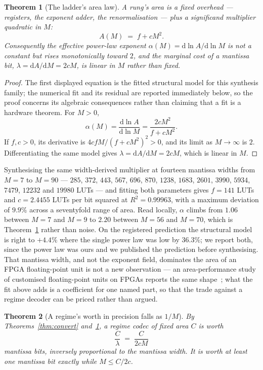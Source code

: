 \documentclass[11pt]{article}
\newtheorem{theorem}{Theorem}
\theoremstyle{definition}
\begin{document}
\begin{theorem}[The ladder's area law]
\label{thm:alpha}
A rung's area is a fixed overhead --- registers, the exponent adder, the
renormalisation --- plus a significand multiplier quadratic in $M$:
\[
A(M) \;=\; f + cM^{2}.
\]
Consequently the effective power-law exponent
$\alpha(M) = \mathrm{d}\ln A/\mathrm{d}\ln M$ is not a constant but rises
monotonically toward $2$, and the marginal cost of a mantissa bit,
$\lambda = \mathrm{d}A/\mathrm{d}M = 2cM$, is \emph{linear} in $M$ rather than
fixed.
\end{theorem}
\begin{proof}
The first displayed equation is the fitted structural model for this synthesis
family; the numerical fit and its residual are reported immediately below, so
the proof concerns its algebraic consequences rather than claiming that a fit is
a hardware theorem. For $M>0$,
\[
\alpha(M)=\frac{\mathrm d\ln A}{\mathrm d\ln M}
          =\frac{2cM^{2}}{f+cM^{2}}.
\]
If $f,c>0$, its derivative is
$4cfM/(f+cM^{2})^{2}>0$, and its limit as $M\to\infty$ is $2$.
Differentiating the same model gives
$\lambda=\mathrm dA/\mathrm dM=2cM$, which is linear in $M$.
\end{proof}

Synthesising the same width-derived multiplier at fourteen mantissa widths from
$M{=}7$ to $M{=}90$ --- $285$, $372$, $443$, $567$, $696$, $870$, $1238$, $1683$,
$2601$, $3990$, $5934$, $7479$, $12232$ and $19980$ LUTs --- and fitting both
parameters gives $f = 141$ LUTs and $c = 2.4455$ LUTs per bit squared at
$R^2 = 0.99963$, with a maximum deviation of $9.9\%$ across a seventyfold range of
area. Read locally, $\alpha$ climbs from $1.06$ between $M{=}7$ and $M{=}9$ to
$2.20$ between $M{=}56$ and $M{=}70$, which is Theorem~\ref{thm:alpha} rather than
noise. On the registered prediction the structural model is right to $+4.4\%$
where the single power law was low by $36.3\%$; we report both, since the power
law was ours and we published the prediction before synthesising. That mantissa
width, and not the exponent field, dominates the area of an FPGA floating-point
unit is not a new observation --- an area-performance study of customised
floating-point units on FPGAs reports the same shape~\cite{echeverria2011customizing};
what the fit above adds is a coefficient for one named part, so that the trade
against a regime decoder can be priced rather than argued.

\begin{theorem}[A regime's worth in precision falls as $1/M$]
\label{thm:oneoverm}
By Theorems~\ref{thm:convert} and~\ref{thm:alpha}, a regime codec of fixed area
$C$ is worth
\[
\frac{C}{\lambda} \;=\; \frac{C}{2cM}
\]
mantissa bits, inversely proportional to the mantissa width. It is worth at least
one mantissa bit exactly while $M \leq C/2c$.
\end{theorem}
\end{document}
